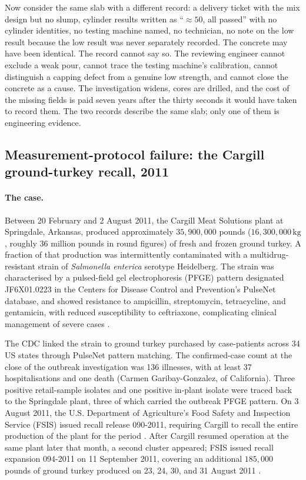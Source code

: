 Now consider the same slab with a different record: a delivery ticket
with the mix design but no slump, cylinder results written as
``$\approx 50$, all passed'' with no cylinder identities, no testing
machine named, no technician, no note on the low result because the low
result was never separately recorded. The concrete may have been
identical. The record cannot say so. The reviewing engineer cannot
exclude a weak pour, cannot trace the testing machine's calibration,
cannot distinguish a capping defect from a genuine low strength, and
cannot close the concrete as a cause. The investigation widens, cores
are drilled, and the cost of the missing fields is paid seven years
after the thirty seconds it would have taken to record them. The two
records describe the same slab; only one of them is engineering
evidence.

\subsection{Measurement-protocol failure: the Cargill ground-turkey recall, 2011}

\paragraph{The case.} Between 20 February and 2 August 2011, the
Cargill Meat Solutions plant at Springdale, Arkansas, produced
approximately $35{,}900{,}000$ pounds ($16{,}300{,}000 \,\si{\kilogram}$,
roughly 36 million pounds in round figures) of fresh and frozen
ground turkey. A fraction of that production was intermittently
contaminated with a multidrug-resistant strain of \emph{Salmonella
enterica} serotype Heidelberg. The strain was characterised by a
pulsed-field gel electrophoresis (PFGE) pattern designated
JF6X01.0223 in the Centers for Disease Control and Prevention's
PulseNet database, and showed resistance to ampicillin,
streptomycin, tetracycline, and gentamicin, with reduced
susceptibility to ceftriaxone, complicating clinical management of
severe cases \cite[p.~46]{acc:ch01t3b-cdc-mmwr-salmonella-heidelberg-2013}.

The CDC linked the strain to ground turkey purchased by
case-patients across 34 US states through PulseNet pattern
matching. The confirmed-case count at the close of the outbreak
investigation was 136 illnesses, with at least 37 hospitalisations
and one death (Carmen Garibay-Gonzalez, of California). Three
positive retail-sample isolates and one positive in-plant isolate
were traced back to the Springdale plant, three of which carried
the outbreak PFGE pattern. On 3 August 2011, the U.S. Department of
Agriculture's Food Safety and Inspection Service (FSIS) issued
recall release 090-2011, requiring Cargill to recall the entire
production of the plant for the period \cite{acc:ch01t3b-usda-fsis-recall-090-2011}.
After Cargill resumed operation at the same plant later that month,
a second cluster appeared; FSIS issued recall expansion 094-2011 on
11 September 2011, covering an additional $185{,}000$ pounds of
ground turkey produced on 23, 24, 30, and 31 August 2011 \cite{acc:ch01t3b-usda-fsis-recall-094-2011}.

